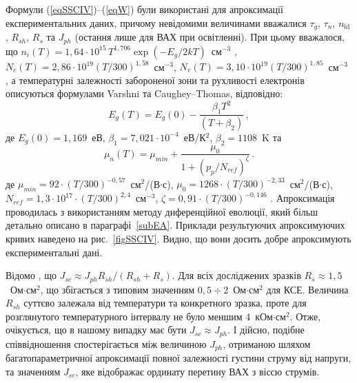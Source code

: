 Формули (\ref{eqSSCIV})--(\ref{eqW}) були використані для апроксимації експериментальних даних, причому
невідомими величинами вважалися $\tau_g$, $\tau_n$, $n_{\mathrm{id}}$, $R_{sh}$, $R_s$ та  $J_{ph}$ (остання лише для ВАХ при освітленні).
При цьому вважалося, що
$n_i(T)=1,64\cdot10^{15}\,T^{1,706}\exp(-E_g/2kT)$~см$^{-3}$ \cite{ni:Green}, $N_c(T)=2,86\cdot10^{19}(T/300)^{1,58}$~см$^{-3}$, $N_v(T)=3,10\cdot10^{19}(T/300)^{1,85}$~см$^{-3}$
\cite{Nc:Green},
а температурні залежності забороненої зони та рухливості електронів описуються формулами Varshni та Caughey--Thomas, відповідно:
\begin{equation}
\label{eqEg}
 E_g(T) = E_g(0) - \frac{\beta_1 T^2}{(T + \beta_2)}\,,
\end{equation}
де
$E_g(0)=1,169$~еВ,
$\beta_1=7,021\cdot10^{-4}$~еВ/К$^2$,
$\beta_2=1108$~K \cite{Schroder2006,Markvart} та
\begin{equation}
\label{eqMu}
\mu_n(T) = \mu_{min}+\frac{\mu_0}{1+(p_p/N_{ref})^{\zeta}}\,.
\end{equation}
де
$\mu_{min}=92\cdot(T/300)^{-0,57}$~см$^2$/(В$\cdot$с),
$\mu_0=1268\cdot(T/300)^{-2,33}$~см$^2$/(В$\cdot$с),
$N_{ref}=1,3\cdot10^{17}\cdot(T/300)^{2,4}$~см$^{-3}$,
$\zeta=0,91\cdot(T/300)^{-0,146}$ \cite[с.~505, Table~A8.2]{Schroder2006}.
Апроксимація проводилась з використанням методу диференційної еволюції\cite{DE:Sun,DEWang,DEModif}, який більш детально описано в параграфі~\ref{subEA}.
Приклади результуючих апроксимуючих кривих наведено  на рис.~\ref{figSSCIV}.
Видно, що вони досить добре апроксимують експериментальні дані.

Відомо \cite{2Diod:Buhler}, що $J_{sc}\approx J_{ph}R_{sh}/(R_{sh}+R_{s})$.
Для всіх досліджених зразків $R_s\approx1,5$~Ом$\cdot$см$^2$,
що збігається з типовим значенням $0,5\div2$~Ом$\cdot$см$^2$ \cite{Breitenstein2013,SCRs:Mette} для КСЕ.
Величина $R_{sh}$ суттєво залежала від температури та конкретного зразка, проте для
розглянутого температурного інтервалу не було меншим  4~кОм$\cdot$см$^2$.
Отже, очікується, що в нашому випадку має бути $J_{sc}\approx J_{ph}$.
І дійсно, подібне співвідношення спостерігається між величиною $J_{ph}$, отриманою шляхом багатопараметричної апроксимації
повної залежності густини струму від напруги, та значенням $J_{sc}$, яке відображає ординату перетину ВАХ з віссю струмів.


